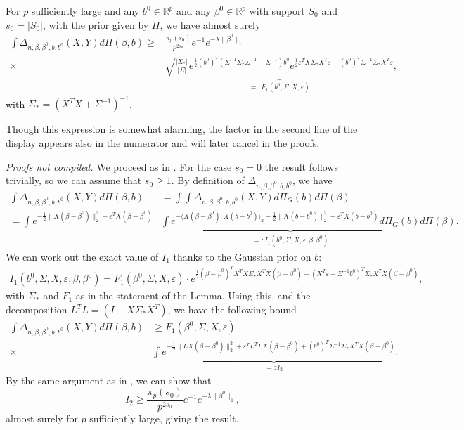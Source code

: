 \documentclass[11pt]{article}
\renewenvironment{proof}[1]{\par\noindent{\bf #1 \ }}{\hfill\BlackBox\\[2mm]}
\renewenvironment{proof}[1]{\textit{Proofs not compiled.}}{}
\newcommand{\eps}{\varepsilon}
\newcommand{\R}{\mathbb{R}}
\newcommand{\bezero}{\beta^0}
\newcommand{\lratio}{\Delta_{n, \beta, \bezero, b, b^0}}
\newcommand{\Pig}{\Pi_{G}}
\newcommand{\postCov}{\Sigma_*}
\begin{document}
\begin{lemma}\label{lem:denom_control}
	For $p$ sufficiently large and any $b^0 \in \R^p$ and any $\bezero \in \R^p$ with support $S_0$ and $s_0 = |S_0|$, with the prior given by $\Pi$, we have almost surely
	\begin{align*}
		\int \lratio(X, Y) d\Pi(\beta, b) \geq &\frac{\pi_p(s_0)}{ p^{2s_0}}e^{-1}e^{-\lambda\|\bezero\|_1}\\
		\times & \underbrace{\sqrt{\frac{|\postCov |}{|\Sigma|}}e^{\frac{1}{2}(b^0)^T\left(\Sigma^{-1}\postCov  \Sigma^{-1}  - \Sigma^{-1}\right)b^0 }e^{\frac{1}{2}\eps^T X\postCov X^T\eps - (b^0)^T\Sigma^{-1}\postCov  X^T \eps}}_{=: F_1(b^0, \Sigma, X,\eps)},
	\end{align*}
	with $\postCov  = (X^TX + \Sigma^{-1})^{-1}$.
\end{lemma}
Though this expression is somewhat alarming, the factor in the second line of the display appears also in the numerator and will later cancel in the proofs.

\begin{proof}{Proof of Lemma \ref{lem:denom_control}.}
	We proceed as in \cite{CS-HV2015}. For the case $s_0 = 0$ the result follows trivially, so we can assume that $s_0 \geq 1$.
	By definition of $\lratio$, we have
	\begin{align*}
				\int \lratio(X, Y) d\Pi(\beta, b) &= \int \int \lratio (X, Y)d\Pig(b)d\Pi(\beta) \\ 
				= \int e^{-\frac{1}{2}\|X(\beta - \bezero)\|_2^2 + \eps^T X(\beta - \bezero)} &\underbrace{\int e^{-\langle X(\beta - \beta^0), X(b - b^0)  \rangle_2 -\frac{1}{2}\|X(b - b^0)\|_2^2 + \eps^TX(b - b^0)}d\Pig(b)}_{=: I_1(b^0, \Sigma, X, \eps, \beta, \bezero)} d\Pi(\beta).
	\end{align*}
	We can work out the exact value of $I_1$ thanks to the Gaussian prior on $b$:
	\begin{align}
		I_1(b^0, \Sigma, X, \eps, \beta, \bezero) = F_1(\bezero, \Sigma, X, \eps)\cdot e^{\frac{1}{2}(\beta - \beta^0)^T X^TX \postCov X^TX(\beta - \beta^0)  - (X^T\eps - \Sigma^{-1}b^0)^T\postCov  X^TX(\beta - \beta^0)}, \label{eq:I_1}
	\end{align}
	with $\postCov $ and $F_1$ as in the statement of the Lemma.
Using this, and the decomposition $L^T L = (I -X\postCov X^T)$, we have the following bound
	\begin{align*}
		\int \lratio(X, Y) d\Pi(\beta, b) &\geq F_1(\bezero, \Sigma, X, \eps) \\
		\times& \underbrace{\int e^{-\frac{1}{2}\|LX(\beta - \bezero)\|_2^2 + \eps^T L^TL X(\beta - \bezero) + (b^0)^T\Sigma^{-1}\postCov  X^T X (\beta - \beta^0)}}_{=: I_2}.
	\end{align*}
	By the same argument as in \cite{CS-HV2015}, we can show that
	$$
	I_2 \geq \frac{\pi_p(s_0)}{p^{2s_0}}e^{-1} e^{-\lambda\|\beta^0\|_1},
	$$
	almost surely for $p$ sufficiently large, giving the result.
\end{proof}
\end{document}
